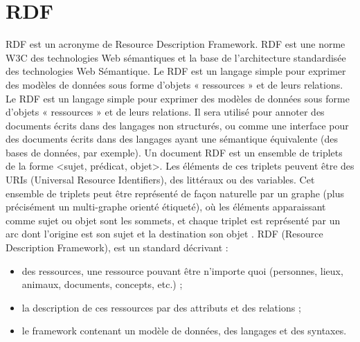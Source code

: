 \documentclass[12pt]{report}
\begin{document}
\section{RDF}
RDF est un acronyme de Resource Description Framework. RDF est une norme W3C des technologies Web sémantiques et la base de l’architecture standardisée des technologies Web Sémantique. Le RDF est un langage simple pour exprimer des modèles de données sous forme d'objets « ressources » et de leurs relations.
Le RDF est un langage simple pour exprimer des
modèles de données sous forme d'objets « ressources » et de leurs relations. Il sera utilisé pour annoter des documents écrits
dans des langages non structurés, ou comme une interface pour des documents écrits dans des langages ayant une
sémantique équivalente (des bases de données, par exemple).
Un document RDF est un ensemble de triplets de la forme <sujet, prédicat, objet>. Les éléments de ces triplets peuvent être
des URIs (Universal Resource Identifiers), des littéraux ou des variables. Cet ensemble de triplets peut être représenté de façon
naturelle par un graphe (plus précisément un multi-graphe orienté étiqueté), où les éléments apparaissant comme sujet ou objet
sont les sommets, et chaque triplet est représenté par un arc dont l’origine est son sujet et la destination son objet .\cite{SEMANTCWEB}
RDF (Resource Description Framework), est un standard décrivant :
\begin{itemize}
 \item des ressources, une ressource pouvant être n'importe quoi (personnes, lieux, animaux, documents,
concepts, etc.) ;
\item la description de ces ressources par des attributs et des relations ;
\item le framework contenant un modèle de données, des langages et des syntaxes.
\end{itemize}
\end{document}
